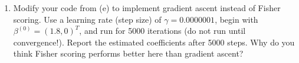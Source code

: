 \documentclass[11pt]{article}
\begin{document}
\begin{enumerate}
\begin{enumerate}
\item Modify your code from (e) to implement gradient ascent instead of Fisher scoring. Use a learning rate (step size) of $\gamma = 0.0000001$, begin with $\beta^{(0)} = (1.8, 0)^T$, and run for 5000 iterations (do not run until convergence!). Report the estimated coefficients after 5000 steps. Why do you think Fisher scoring performs better here than gradient ascent?
\end{enumerate}

\end{enumerate}
\end{document}
